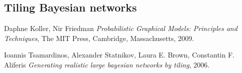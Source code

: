 \documentclass{article}
\begin{document}
\subsection{Tiling Bayesian networks \cite{Tsamardinos2006}}

\begin{thebibliography}{9}
	
	Daphne Koller, Nir Friedman
	\emph{Probabilistic Graphical Models: Principles and Techniques},
	The MIT Press, Cambridge, Massachusetts,
	2009.
	
	Ioannis Tsamardinos, Alexander Statnikov, Laura E. Brown, Constantin F. Aliferis
	\emph{Generating realistic large bayesian networks by tiling},
	2006.
	
	
	
\end{thebibliography}
\end{document}
